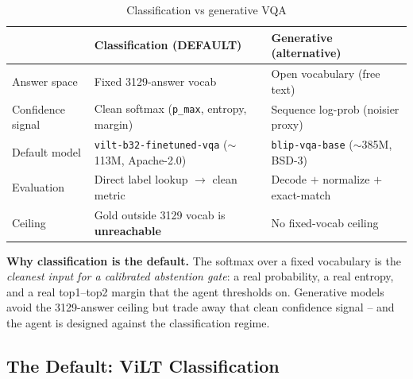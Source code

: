 \documentclass[12pt,a4paper]{article}
\begin{document}
\begin{table}[H]
\centering
\caption{Classification vs generative VQA}
\small
\begin{tabularx}{\linewidth}{@{} l L L @{}}
\toprule
 & \textbf{Classification (DEFAULT)} & \textbf{Generative (alternative)} \\
\midrule
Answer space & Fixed 3129-answer vocab & Open vocabulary (free text) \\
Confidence signal & Clean softmax (\texttt{p\_max}, entropy, margin) & Sequence log-prob (noisier proxy) \\
Default model & \texttt{vilt-b32-finetuned-vqa} ($\sim$113M, Apache-2.0) & \texttt{blip-vqa-base} ($\sim$385M, BSD-3) \\
Evaluation & Direct label lookup $\rightarrow$ clean metric & Decode $+$ normalize $+$ exact-match \\
Ceiling & Gold outside 3129 vocab is \textbf{unreachable} & No fixed-vocab ceiling \\
\bottomrule
\end{tabularx}
\end{table}

\textbf{Why classification is the default.} The softmax over a fixed vocabulary is the \emph{cleanest input for a calibrated abstention gate}: a real probability, a real entropy, and a real top1--top2 margin that the agent thresholds on. Generative models avoid the 3129-answer ceiling but trade away that clean confidence signal -- and the agent is designed against the classification regime.

\subsection{The Default: ViLT Classification}
\end{document}
